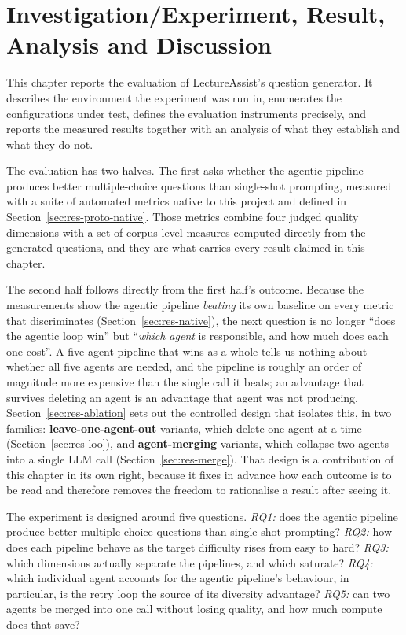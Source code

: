 \chapter{Investigation/Experiment, Result, Analysis and Discussion}
\label{ch:results}

This chapter reports the evaluation of LectureAssist's question generator. It
describes the environment the experiment was run in, enumerates the
configurations under test, defines the evaluation instruments precisely, and
reports the measured results together with an analysis of what they establish
and what they do not.

The evaluation has two halves. The first asks whether the agentic pipeline
produces better multiple-choice questions than single-shot prompting, measured
with a suite of automated metrics native to this project and defined in
Section~\ref{sec:res-proto-native}. Those metrics combine four judged quality
dimensions with a set of corpus-level measures computed directly from the
generated questions, and they are what carries every result claimed in this
chapter.

The second half follows directly from the first half's outcome. Because the
measurements show the agentic pipeline \emph{beating} its own baseline on every
metric that discriminates (Section~\ref{sec:res-native}), the next question is
no longer ``does the agentic loop win'' but ``\emph{which agent} is responsible,
and how much does each one cost''. A five-agent pipeline that wins as a whole
tells us nothing about whether all five agents are needed, and the pipeline is
roughly an order of magnitude more expensive than the single call it beats; an
advantage that survives deleting an agent is an advantage that agent was not
producing. Section~\ref{sec:res-ablation} sets out the controlled design that
isolates this, in two families: \textbf{leave-one-agent-out} variants, which
delete one agent at a time (Section~\ref{sec:res-loo}), and
\textbf{agent-merging} variants, which collapse two agents into a single LLM
call (Section~\ref{sec:res-merge}). That design is a contribution of this
chapter in its own right, because it fixes in advance how each outcome is to be
read and therefore removes the freedom to rationalise a result after seeing it.

The experiment is designed around five questions.
\emph{RQ1:} does the agentic pipeline produce better multiple-choice questions
than single-shot prompting?
\emph{RQ2:} how does each pipeline behave as the target difficulty rises from
easy to hard?
\emph{RQ3:} which dimensions actually separate the pipelines, and which
saturate?
\emph{RQ4:} which individual agent accounts for the agentic pipeline's
behaviour, in particular, is the retry loop the source of its diversity
advantage?
\emph{RQ5:} can two agents be merged into one call without losing quality, and
how much compute does that save?

